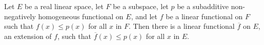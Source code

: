 Let $E$ be a real linear space, let $F$ be a subspace, let $p$ be a subadditive non-negatively homogeneous functional on $E$, and let $f$ be a linear functional on $F$ such that $f(x) \leq p(x)$ for all $x$ in $F$. Then there is a linear functional $\overline{f}$ on $E$, an extension of $f$, such that $\overline{f}(x) \leq p(x)$ for all $x$ in $E$.
